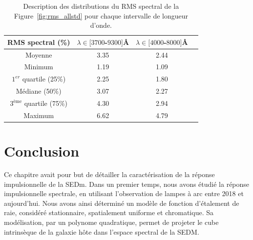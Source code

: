 \documentclass[../main/main.tex]{subfiles}
\begin{document}
\begin{table}[ht]
  \centerfloat
  \renewcommand{\arraystretch}{1.4}
  \caption[Description des distributions du RMS spectral des
  calibrations en flux.]{Description des distributions du RMS spectral de la
    Figure~\ref{fig:rms_allstd} pour chaque intervalle de longueur d'onde.}
  \label{tab:rms_allstd_detail}
  \begin{threeparttable}
    \begin{tabular}{cccc}
      \toprule
      \textbf{RMS spectral (\%)} & $\lambda \in [3700$-$9300]$\AA & $\lambda \in [4000$-$8000]$\AA   \\
      \midrule
      Moyenne  &                                       3.35 &                                       2.44 \\
      Minimum   &                                       1.19 &                                       1.09  \\
      $1^{er}$ quartile (25\%)   &                                       2.25 &                                       1.80 \\
      Médiane (50\%)   &                                       3.07 &                                       2.27 \\
      $3^{\text{ème}}$ quartile (75\%)   &                                       4.30 &                                       2.94  \\
      Maximum   &                                       6.62 &                                       4.79  \\
      \bottomrule
    \end{tabular}

  \end{threeparttable}
\end{table}
\clearpage
\section*{Conclusion}
Ce chapitre avait pour but de détailler la caractérisation de la réponse
impulsionnelle de la SEDm. Dans un premier temps, nous avons
étudié la réponse impulsionnelle spectrale, en utilisant l'observation de
lampes à arc entre 2018 et aujourd'hui. Nous avons ainsi déterminé un
modèle de fonction d'étalement
de raie, considéré stationnaire,
spatialement uniforme et chromatique. Sa modélisation, par un
polynome quadratique, permet de projeter le cube intrinsèque de la galaxie
hôte dans l'espace spectral de la SEDM.
\end{document}
